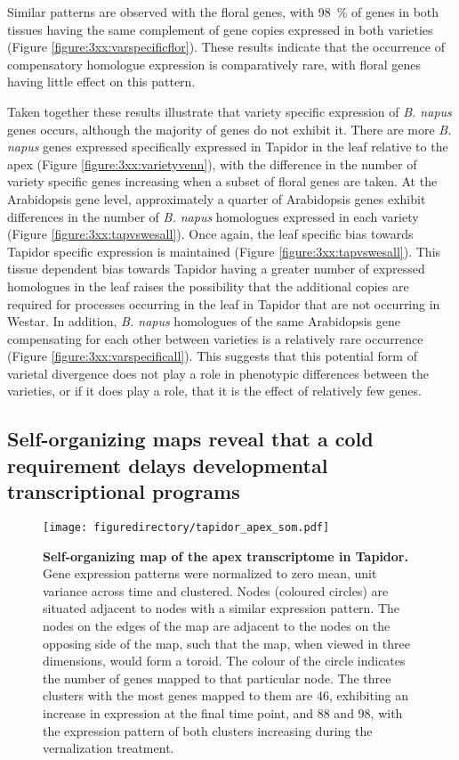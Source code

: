 \documentclass[12pt,]{book}
\begin{document}
Similar patterns are observed with the floral genes, with 98~\% of genes
in both tissues having the same complement of gene copies expressed in
both varieties (Figure \ref{figure:3xx:varspecificflor}). These results
indicate that the occurrence of compensatory homologue expression is
comparatively rare, with floral genes having little effect on this
pattern.

Taken together these results illustrate that variety specific expression
of \emph{B. napus} genes occurs, although the majority of genes do not
exhibit it. There are more \emph{B. napus} genes expressed specifically
expressed in Tapidor in the leaf relative to the apex (Figure
\ref{figure:3xx:varietyvenn}), with the difference in the number of
variety specific genes increasing when a subset of floral genes are
taken. At the Arabidopsis gene level, approximately a quarter of
Arabidopsis genes exhibit differences in the number of \emph{B. napus}
homologues expressed in each variety (Figure
\ref{figure:3xx:tapvswesall}). Once again, the leaf specific bias
towards Tapidor specific expression is maintained (Figure
\ref{figure:3xx:tapvswesall}). This tissue dependent bias towards
Tapidor having a greater number of expressed homologues in the leaf
raises the possibility that the additional copies are required for
processes occurring in the leaf in Tapidor that are not occurring in
Westar. In addition, \emph{B. napus} homologues of the same Arabidopsis
gene compensating for each other between varieties is a relatively rare
occurrence (Figure \ref{figure:3xx:varspecificall}). This suggests that
this potential form of varietal divergence does not play a role in
phenotypic differences between the varieties, or if it does play a role,
that it is the effect of relatively few genes.

\subsection{Self-organizing maps reveal that a cold requirement delays
developmental transcriptional programs}\label{section:winter:som}

\begin{figure}[htbp]
\centering
\texttt{[image: figuredirectory/tapidor\_apex\_som.pdf]}
\caption{\textbf{Self-organizing map of the apex transcriptome in
Tapidor.} Gene expression patterns were normalized to zero mean, unit
variance across time and clustered. Nodes (coloured circles) are
situated adjacent to nodes with a similar expression pattern. The nodes
on the edges of the map are adjacent to the nodes on the opposing side
of the map, such that the map, when viewed in three dimensions, would
form a toroid. The colour of the circle indicates the number of genes
mapped to that particular node. The three clusters with the most genes
mapped to them are 46, exhibiting an increase in expression at the final
time point, and 88 and 98, with the expression pattern of both clusters
increasing during the vernalization
treatment.}\label{figure:3xx:tapsomapex}
\end{figure}
\end{document}
